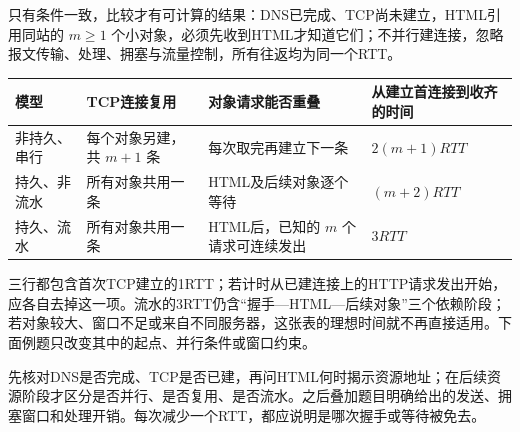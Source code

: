 只有条件一致，比较才有可计算的结果：DNS已完成、TCP尚未建立，HTML引用同站的 \(m\ge1\) 个小对象，必须先收到HTML才知道它们；不并行建连接，忽略报文传输、处理、拥塞与流量控制，所有往返均为同一个RTT。

\begin{wideblock}

\par\medskip\noindent\begin{minipage}{\linewidth}\fontsize{9.3}{12}\selectfont\begin{tabularx}{\linewidth}{@{}YYYY@{}}
\toprule\noalign{}
\begin{minipage}[b]{\linewidth}\raggedright
模型
\end{minipage} & \begin{minipage}[b]{\linewidth}\raggedright
TCP连接复用
\end{minipage} & \begin{minipage}[b]{\linewidth}\raggedright
对象请求能否重叠
\end{minipage} & \begin{minipage}[b]{\linewidth}\raggedright
从建立首连接到收齐的时间
\end{minipage} \\
\midrule\noalign{}


非持久、串行 & 每个对象另建，共 \(m+1\) 条 & 每次取完再建立下一条 & \(2(m+1)RTT\) \\
持久、非流水 & 所有对象共用一条 & HTML及后续对象逐个等待 & \((m+2)RTT\) \\
持久、流水 & 所有对象共用一条 & HTML后，已知的 \(m\) 个请求可连续发出 & \(3RTT\) \\
\bottomrule\end{tabularx}
\end{minipage}\par\medskip

\end{wideblock}

三行都包含首次TCP建立的1RTT；若计时从已建连接上的HTTP请求发出开始，应各自去掉这一项。流水的3RTT仍含``握手---HTML---后续对象''三个依赖阶段；若对象较大、窗口不足或来自不同服务器，这张表的理想时间就不再直接适用。下面例题只改变其中的起点、并行条件或窗口约束。

\begin{methodbox}[HTTP时延按依赖分段]

先核对DNS是否完成、TCP是否已建，再问HTML何时揭示资源地址；在后续资源阶段才区分是否并行、是否复用、是否流水。之后叠加题目明确给出的发送、拥塞窗口和处理开销。每次减少一个RTT，都应说明是哪次握手或等待被免去。

\end{methodbox}

